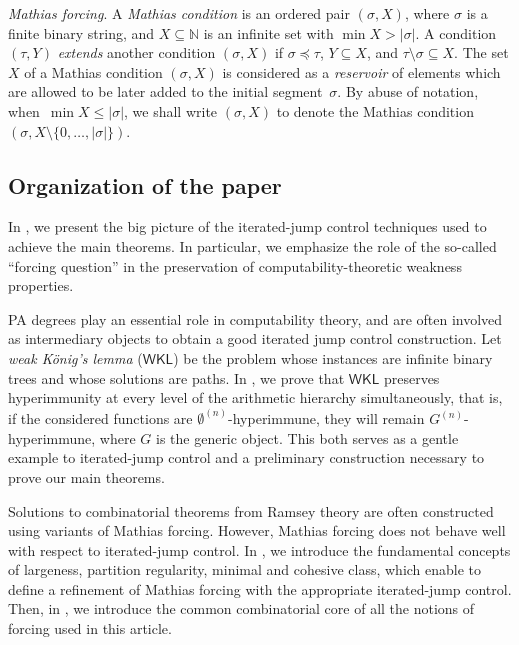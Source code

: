 \documentclass{article}
\def\NN{\mathbb{N}}
\newcommand{\WKL}{\mathsf{WKL}}
\def\qt#1{``#1''}%
\numberwithin{theorem}{section}
\theoremstyle{definition}
\begin{document}
\emph{Mathias forcing}. A \emph{Mathias condition} is an ordered pair $(\sigma, X)$, where $\sigma$ is a finite binary string, and $X \subseteq \NN$ is an infinite set with $\min X > |\sigma|$. A condition $(\tau, Y)$ \emph{extends} another condition $(\sigma, X)$ if $\sigma \preceq \tau$, $Y \subseteq X$, and $\tau \setminus \sigma \subseteq X$. The set $X$ of a Mathias condition $(\sigma, X)$ is considered as a \emph{reservoir} of elements which are allowed to be later added to the initial segment~$\sigma$. By abuse of notation, when~$\min X \leq |\sigma|$, we shall write $(\sigma, X)$ to denote the Mathias condition $(\sigma, X \setminus \{0, \dots, |\sigma|\})$.

\subsection{Organization of the paper}

In , we present the big picture of the iterated-jump control techniques used to achieve the main theorems. In particular, we emphasize the role of the so-called \qt{forcing question} in the preservation of computability-theoretic weakness properties.

PA degrees play an essential role in computability theory, and are often involved as intermediary objects to obtain a good iterated jump control construc\-tion. Let \emph{weak K\"onig's lemma} ($\WKL$) be the problem whose instances are infinite binary trees and whose solutions are paths. In , we prove that $\WKL$ preserves hyperimmunity at every level of the arithmetic hierarchy simultaneously, that is, if the considered functions are $\emptyset^{(n)}$-hyperimmune, they will remain $G^{(n)}$-hyperimmune, where $G$ is the generic object. This both serves as a gentle example to iterated-jump control and a preliminary construction necessary to prove our main theorems.

Solutions to combinatorial theorems from Ramsey theory are often constructed using variants of Mathias forcing. However, Mathias forcing does not behave well with respect to iterated-jump control. In , we introduce the fundamental concepts of largeness, partition regularity, minimal and cohesive class, which enable to define a refinement of Mathias forcing with the appropriate iterated-jump control. Then, in , we introduce the common combinatorial core of all the notions of forcing used in this article.
\end{document}
